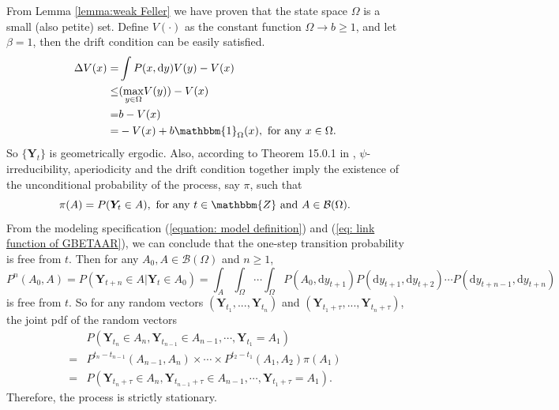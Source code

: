 \documentclass{article}
\theoremstyle{definition}
\begin{document}
From Lemma \ref{lemma:weak Feller} we have proven that the state space $\Omega$ is a small (also petite) set. Define $V(\cdot)$ as the constant function $\Omega \rightarrow b \geq 1$, and let $\beta = 1$, then the drift condition can be easily satisfied.
\begin{equation*}
    \begin{aligned}
    \Delta V(x) = & \int P(x,\text{d}y)V(y)-V(x) \\
             \leq & (\underset{y \in \Omega} {\max}V(y))-V(x) \\
              = & b-V(x) \\
              = & -V(x)+b\mathbbm{1}_{\Omega}(x), \text{ for any }x \in \Omega.
    \end{aligned}
\end{equation*}
So $\{\bm{Y}_t\}$ is geometrically ergodic. Also, according to Theorem 15.0.1 in \cite{meyn1993markov},  $\psi$-irreducibility, aperiodicity and the drift condition together imply the existence of the unconditional probability of the process, say $\pi$, such that
\begin{equation*}
    \pi(A) = P(\bm{Y}_t \in A), \text{ for any } t\in \mathbbm{Z} \text{ and }A \in \mathcal{B}(\Omega).
\end{equation*}
From the modeling specification (\ref{equation: model definition}) and (\ref{eq: link function of GBETAAR}), we can conclude that the one-step transition probability is free from $t$. Then for any $A_0, A \in \mathcal{B}(\Omega)$ and $n\geq 1$, 
\begin{equation*}
    P^n(A_0,A) = P(\bm{Y}_{t+n} \in A|\bm{Y}_t \in A_0) = \int_A \int_{\Omega}\cdots \int_{\Omega}P(A_0,\text{d}y_{t+1})P(\text{d}y_{t+1},\text{d}y_{t+2})\cdots P(\text{d}y_{t+n-1},\text{d}y_{t+n})
\end{equation*}
is free from $t$. So for any random vectors $(\bm{Y}_{t_1},...,\bm{Y}_{t_n})$ and $(\bm{Y}_{t_1+\tau},...,\bm{Y}_{t_n+\tau})$, the joint pdf of the random vectors
\begin{equation*}
\begin{aligned}
    & P(\bm{Y}_{t_n} \in A_{n}, \bm{Y}_{t_{n-1}} \in A_{n-1},\cdots,\bm{Y}_{t_1}=A_1) \\
    = &P^{t_{n}-t_{n-1}}(A_{n-1},A_n)\times \cdots \times P^{t_{2}-t_{1}}(A_1,A_2)\pi(A_1)\\
    = &P(\bm{Y}_{t_n+\tau} \in A_{n}, \bm{Y}_{t_{n-1}+\tau} \in A_{n-1},\cdots,\bm{Y}_{t_1+\tau}=A_1).
\end{aligned}
\end{equation*}
Therefore, the process is strictly stationary.
\end{document}
